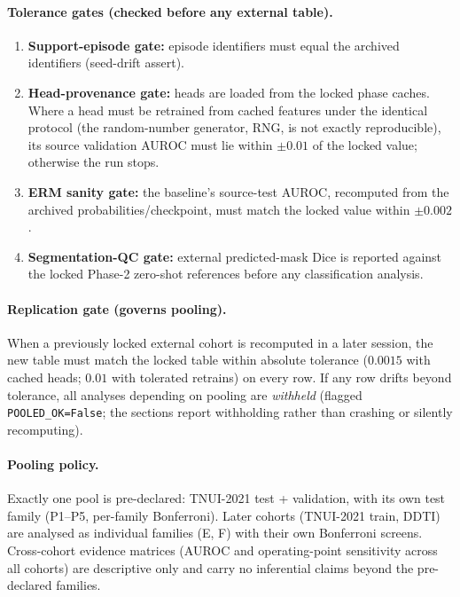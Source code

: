 \documentclass[11pt]{article}
\begin{document}
\paragraph{Tolerance gates (checked before any external table).}
\begin{enumerate}
  \item \textbf{Support-episode gate:} episode identifiers must equal the
  archived identifiers (seed-drift assert).
  \item \textbf{Head-provenance gate:} heads are loaded from the locked
  phase caches. Where a head must be retrained from cached features under
  the identical protocol (the random-number generator, RNG, is not exactly
  reproducible), its source validation AUROC must lie within $\pm 0.01$ of
  the locked value; otherwise the run stops.
  \item \textbf{ERM sanity gate:} the baseline's source-test AUROC,
  recomputed from the archived probabilities/checkpoint, must match the
  locked value within $\pm 0.002$.
  \item \textbf{Segmentation-QC gate:} external predicted-mask Dice is
  reported against the locked Phase-2 zero-shot references before any
  classification analysis.
\end{enumerate}

\paragraph{Replication gate (governs pooling).}
When a previously locked external cohort is recomputed in a later session,
the new table must match the locked table within absolute tolerance
($0.0015$ with cached heads; $0.01$ with tolerated retrains) on every row.
If any row drifts beyond tolerance, all analyses depending on pooling are
\emph{withheld} (flagged \texttt{POOLED\_OK=False}; the sections report
withholding rather than crashing or silently recomputing).

\paragraph{Pooling policy.}
Exactly one pool is pre-declared: TNUI-2021 test + validation, with its own
test family (P1--P5, per-family Bonferroni). Later cohorts (TNUI-2021
train, DDTI) are analysed as individual families (E, F) with their own
Bonferroni screens. Cross-cohort evidence matrices (AUROC and
operating-point sensitivity across all cohorts) are descriptive only and
carry no inferential claims beyond the pre-declared families.
\end{document}
